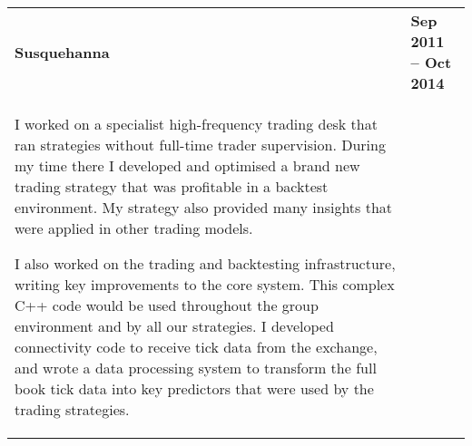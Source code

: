 \documentclass[]{article}
\begin{document}
\begin{table*}[h!]
\begin{tabular}[h!]{p{12.7cm}l}
\textbf{Susquehanna} & \textbf{Sep 2011 -- Oct 2014}\\


\vspace{0.05cm}
\hspace{0.5cm} I worked on a specialist high-frequency trading desk that ran strategies without full-time trader supervision. During my time there I developed and optimised a brand new trading strategy that was profitable in a backtest environment. My strategy also provided many insights that were applied in other trading models.

\hspace{0.5cm}I also worked on the trading and backtesting infrastructure, writing key improvements to the core system. This complex C++ code would be used throughout the group environment and by all our strategies. I developed connectivity code to receive tick data from the exchange, and wrote a data processing system to transform the full book tick data into key predictors that were used by the trading strategies.


\end{tabular}
\end{table*}
\end{document}
